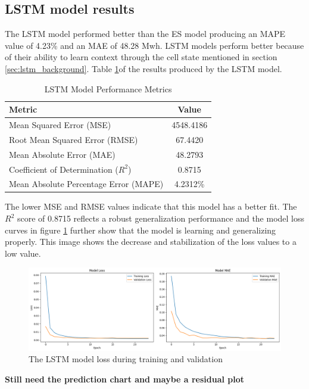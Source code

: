 \subsection{LSTM model results}
The LSTM model performed better than the ES model producing an MAPE value of 4.23\% and an MAE of 48.28 Mwh. LSTM models perform better because of their ability to learn context through the cell state mentioned in section \ref{sec:lstm_background}. Table \ref{tab:lstm_performance}of the results produced by the LSTM model.
\begin{table}[h]
	\centering
	
	\begin{tabular}{lc}
		\hline
		\textbf{Metric} & \textbf{Value} \\
		\hline
		Mean Squared Error (MSE) & 4548.4186 \\
		Root Mean Squared Error (RMSE) & 67.4420 \\
		Mean Absolute Error (MAE) & 48.2793 \\
		Coefficient of Determination ($R^2$) & 0.8715 \\
		Mean Absolute Percentage Error (MAPE) & 4.2312\% \\
		\hline
	\end{tabular}
	\caption{LSTM Model Performance Metrics}
	\label{tab:lstm_performance}
\end{table}
 The lower MSE and RMSE values indicate that this model has a better fit. The $R^2$ score of 0.8715 reflects a robust generalization performance and the model loss curves in figure \ref{fig:lstmmodel-loss} further show that the model is learning and generalizing properly. This image shows the decrease and stabilization of the loss values to a low value.
 \begin{figure}[h]
 	\centering
 	\includegraphics[width=0.9\linewidth]{"Chapters/images/results/lstm_model loss"}
 	\caption{The LSTM model loss during training and validation}
 	\label{fig:lstmmodel-loss}
 \end{figure}
 \textbf{Still need the prediction chart and maybe a residual plot}
 
